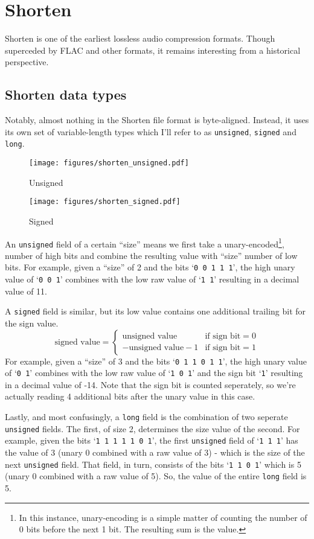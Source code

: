 \chapter{Shorten}
Shorten is one of the earliest lossless audio compression formats.
Though superceded by FLAC and other formats, it remains interesting
from a historical perspective.

\section{Shorten data types}
Notably, almost nothing in the Shorten file format is byte-aligned.
Instead, it uses its own set of variable-length types which I'll
refer to as \texttt{unsigned}, \texttt{signed} and \texttt{long}.

\begin{wrapfigure}[16]{r}{2in}
\texttt{[image: figures/shorten\_unsigned.pdf]}
\caption{Unsigned}
\texttt{[image: figures/shorten\_signed.pdf]}
\caption{Signed}
\end{wrapfigure}
An \texttt{unsigned} field of a certain ``size'' means we first
take a unary-encoded\footnote{In this instance, unary-encoding is a simple
matter of counting the number of 0 bits before the next 1 bit.
The resulting sum is the value.}, number of high bits and combine
the resulting value with ``size'' number of low bits.
For example, given a ``size'' of 2 and the bits `\texttt{0 0 1 1 1}',
the high unary value of `\texttt{0 0 1}' combines with the low
raw value of `\texttt{1 1}' resulting in a decimal value of 11.

A \texttt{signed} field is similar, but its low value contains
one additional trailing bit for the sign value.
{
\begin{equation*}
\text{signed value} =
\begin{cases}
\text{unsigned value} & \text{if sign bit} = 0 \\
-\text{unsigned value} - 1 & \text{if sign bit} = 1
\end{cases}
\end{equation*}
}
For example, given a ``size'' of 3 and the bits `\texttt{0 1 1 0 1 1}',
the high unary value of `\texttt{0 1}' combines with the low
raw value of `\texttt{1 0 1}' and the sign bit `\texttt{1}'
resulting in a decimal value of -14.
Note that the sign bit is counted seperately, so we're
actually reading 4 additional bits after the unary value in this case.

Lastly, and most confusingly, a \texttt{long} field is the combination
of two seperate \texttt{unsigned} fields.
The first, of size 2, determines the size value of the second.
For example, given the bits `\texttt{1 1 1 1 1 0 1}',
the first \texttt{unsigned} field of `\texttt{1 1 1}' has the value
of 3 (unary 0 combined with a raw value of 3) - which is the size
of the next \texttt{unsigned} field.
That field, in turn, consists of the bits `\texttt{1 1 0 1}'
which is 5 (unary 0 combined with a raw value of 5).
So, the value of the entire \texttt{long} field is 5.

